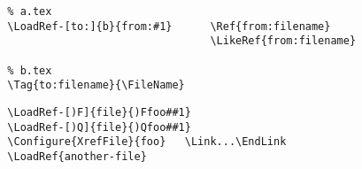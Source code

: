 \documentclass[a4paper]{article}
\begin{document}
\fspace=6mm

   \Example

\begin{verbatim}
  % a.tex
  \LoadRef-[to:]{b}{from:#1}      \Ref{from:filename}
                                  \LikeRef{from:filename}

  % b.tex
  \Tag{to:filename}{\FileName}
\end{verbatim}

   \Example

\begin{verbatim}
  \LoadRef-[)F]{file}{)Ffoo##1}
  \LoadRef-[)Q]{file}{)Qfoo##1}
  \Configure{XrefFile}{foo}   \Link...\EndLink
  \LoadRef{another-file}
\end{verbatim}
\end{document}
